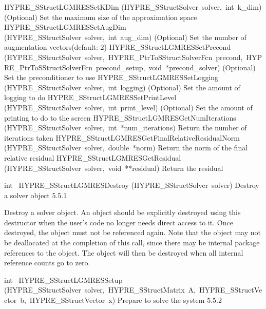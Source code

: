 \documentclass{article}
\begin{document}
\begin{cxxentry}
\begin{cxxentry}
\begin{cxxnames}
        {}
\label{cxx.5.5.7}
        {HYPRE\_SStructLGMRESSetKDim}
        {(HYPRE\_SStructSolver\ solver,\ int\ k\_dim)}
        {
(Optional) Set the maximum size of the approximation space}
        {}
\label{cxx.5.5.8}
        {HYPRE\_SStructLGMRESSetAugDim}
        {(HYPRE\_SStructSolver\ solver,\ int\ aug\_dim)}
        {
(Optional) Set the number of augmentation vectors(default: 2)}
        {}
\label{cxx.5.5.9}
        {HYPRE\_SStructLGMRESSetPrecond}
        {(HYPRE\_SStructSolver\ solver,\ HYPRE\_PtrToSStructSolverFcn\ precond,\ HYPRE\_PtrToSStructSolverFcn\ precond\_setup,\ void\ *precond\_solver)}
        {
(Optional) Set the preconditioner to use}
        {}
\label{cxx.5.5.10}
        {HYPRE\_SStructLGMRESSetLogging}
        {(HYPRE\_SStructSolver\ solver,\ int\ logging)}
        {
(Optional) Set the amount of logging to do}
        {}
\label{cxx.5.5.11}
        {HYPRE\_SStructLGMRESSetPrintLevel}
        {(HYPRE\_SStructSolver\ solver,\ int\ print\_level)}
        {
(Optional) Set the amount of printing to do to the screen}
        {}
\label{cxx.5.5.12}
        {HYPRE\_SStructLGMRESGetNumIterations}
        {(HYPRE\_SStructSolver\ solver,\ int\ *num\_iterations)}
        {
Return the number of iterations taken}
        {}
\label{cxx.5.5.13}
        {HYPRE\_SStructLGMRESGetFinalRelativeResidualNorm}
        {(HYPRE\_SStructSolver\ solver,\ double\ *norm)}
        {
Return the norm of the final relative residual}
        {}
\label{cxx.5.5.14}
        {HYPRE\_SStructLGMRESGetResidual}
        {(HYPRE\_SStructSolver\ solver,\ void\ **residual)}
        {
Return the residual}
        {}
\label{cxx.5.5.15}
\end{cxxnames}
\begin{cxxfunction}
{int\ }
        {HYPRE\_SStructLGMRESDestroy}
        {(HYPRE\_SStructSolver\ solver)}
        {
Destroy a solver object}
        {5.5.1}
\begin{cxxdoc}

Destroy a solver object.  An object should be explicitly destroyed
using this destructor when the user's code no longer needs direct
access to it.  Once destroyed, the object must not be referenced
again.  Note that the object may not be deallocated at the
completion of this call, since there may be internal package
references to the object.  The object will then be destroyed when
all internal reference counts go to zero.
\end{cxxdoc}
\end{cxxfunction}
\begin{cxxfunction}
{int\ }
        {HYPRE\_SStructLGMRESSetup}
        {(HYPRE\_SStructSolver\ solver,\ HYPRE\_SStructMatrix\ A,\ HYPRE\_SStructVector\ b,\ HYPRE\_SStructVector\ x)}
        {
Prepare to solve the system}
        {5.5.2}
\begin{cxxdoc}


\end{cxxdoc}
\end{cxxfunction}
\end{cxxentry}
\end{cxxentry}
\end{document}
